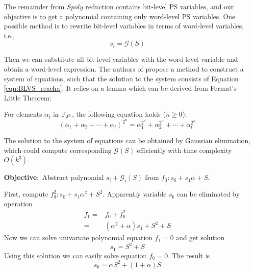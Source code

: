 The remainder from $Spoly$ reduction contains bit-level PS variables, and our objective is to get a polynomial 
containing only word-level PS variables. One possible method is 
to rewrite bit-level variables in terms of word-level variables, i.e.,
\begin{equation}
\label{eqn:BLVS_reacha}
s_i = \mathcal{G}(S)
\end{equation}

Then we can substitute all bit-level variables with the word-level variable
and obtain a word-level expression.
The authors of \cite{pruss:tcad15} propose a method to construct 
a system of equations, such that the solution to the system consists of Equation \ref{eqn:BLVS_reacha}.
It relies on a lemma which can be derived from Fermat's Little Theorem:
\begin{Lemma}
\label{lem:Fermat}
For elements $\alpha_i$ in ${\mathbb{F}}_{2^k}$, the following equation holds ($n\geq 0$):
$$(\alpha_1+\alpha_2+\cdots+\alpha_t)^{2^n} = \alpha_1^{2^n}+\alpha_2^{2^n}+\cdots+\alpha_t^{2^n}$$
\end{Lemma}

The solution to the system of equations can be obtained by Gaussian elimination, which could 
compute corresponding $\mathcal{G}(S)$ efficiently with time complexity $O(k^3)$.

\begin{Example}
{\bf Objective}:\ Abstract polynomial $s_i + \mathcal{G}_i(S)$ from $f_0: s_0+s_1\alpha+S$.

First, compute $f_0^2: s_0+s_1\alpha^2+S^2$. Apparently variable $s_0$ can be
eliminated by operation 
\begin{align}
f_1 =& f_0 + f_0^2 \nonumber\\
=&(\alpha^2+\alpha)s_1+S^2+S\nonumber
\end{align}
Now we can solve univariate polynomial equation $f_1 = 0$ and get solution
$$s_1 = S^2 + S$$
Using this solution we can easily solve equation $f_0 = 0$. The result is
$$s_0 = \alpha S^2+(1+\alpha)S$$
\end{Example}

